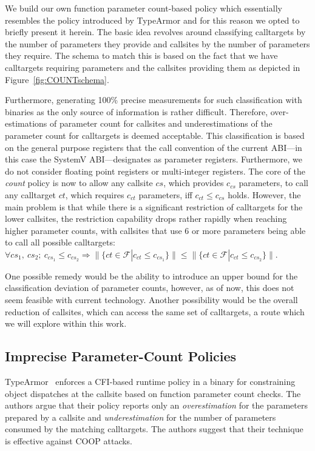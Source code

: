 We build our own function parameter count-based policy which essentially resembles the policy introduced by TypeArmor \cite{veen:typearmor} and
for this reason we opted to briefly present it herein.
The basic idea revolves around classifying calltargets by the number of parameters they provide and callsites 
by the number of parameters they require. The schema to match this is based on the fact that we  
have calltargets requiring parameters and the callsites providing them as depicted in Figure~\ref{fig:COUNTschema}.

Furthermore, generating 100\% precise measurements for such classification with binaries as the only source of information is rather difficult. 
Therefore, over-estimations of parameter count for callsites and underestimations of the parameter count for calltargets is deemed acceptable. 
This classification is based on the general purpose registers that the call convention of the current ABI---in this case the 
SystemV ABI---designates as parameter registers. Furthermore, we do not consider floating point registers or multi-integer registers. 
The core of the \emph{count} policy is now to allow any callsite $cs$, which provides $c_{cs}$ parameters, to call any calltarget $ct$, 
which requires $c_{ct}$ parameters, iff $c_{ct} \leq c_{cs}$ holds. However, the main problem is that while there is a significant 
restriction of calltargets for the lower callsites, the restriction capability drops rather rapidly when reaching higher parameter 
counts, with callsites that use 6 or more parameters being able to call all possible calltargets:
$\forall cs_1, \ cs_2; \ c_{cs_1} \leq c_{cs_2} \Longrightarrow  \| \{ct \in \mathcal{F} | c_{ct} \leq c_{cs_1} \} \| \leq \| \{ct \in \mathcal{F} | c_{ct} \leq c_{cs_2}  \} \|$.

One possible remedy would be the ability to introduce an upper bound for the classification deviation of parameter counts, 
however, as of now, this does not seem feasible with current technology. Another possibility would be the overall reduction
of callsites, which can access the same set of calltargets, a route which we will explore within this work.

\subsection{Imprecise Parameter-Count Policies}
\label{Too Permissive Parameter-Based Policies}
TypeArmor~\cite{veen:typearmor} enforces a CFI-based runtime policy in a binary for constraining object dispatches at the callsite based on
function parameter count checks. The authors argue that their policy reports only an \textit{overestimation} for the parameters prepared by a 
callsite and \textit{underestimation} for the number of parameters consumed by the matching calltargets. 
The authors suggest that their technique is effective against COOP attacks. 

